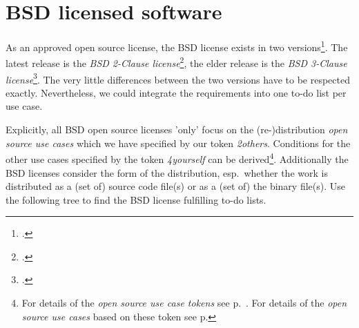 %
%
%
%
%



\section{BSD licensed software}

As an approved open source license, the BSD license exists in two
versions\footcite[Following the OSI, there is another 'ancient' 
BSD license -- containing a fourth clause known as advertising clause -- which
\enquote{(\ldots) officially was rescinded by the Director of the Office of
Technology Licensing of the University of California on July 22nd, 1999}.
 Cf.][\nopage wp.\ Because of that cancellation you can simply act according the
 \textit{BSD 3-Clause license} if you have to fulfill the eldest BSD
 license]{BsdLicense3Clause}. The latest release is the \textit{BSD 2-Clause
 license}\footcite[cf.][\nopage wp]{BsdLicense2Clause}, the elder release is the
 \textit{BSD 3-Clause license}\footcite[cf.][\nopage wp]{BsdLicense3Clause}.
 The very little differences between the two versions have to be respected
 exactly. Nevertheless, we could integrate the requirements into one to-do list
 per use case.

Explicitly, all BSD open source licenses 'only' focus on the (re-)distribution
\textit{open source use cases} which we have specified by our token
\textit{2others}. Conditions for the other use cases specified by the token
\textit{4yourself} can be derived\footnote{For details of the \textit{open
source use case tokens} see p.\ \pageref{OsucTokens}. For details of the
\textit{open source use cases} based on these token see p.
\pageref{OsucDefinitionTree} }. Additionally the BSD licenses consider the form
of the distribution, esp.\ whether the work is distributed as a (set of) source
code file(s) or as a (set of) the binary file(s). Use the following tree to find
the BSD license fulfilling to-do lists.

